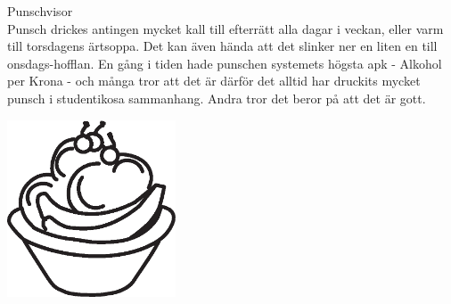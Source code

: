 \begin{flushleft}
{\Huge Punschvisor\\}
\vspace{1cm}
\Large{
Punsch drickes antingen mycket kall till efterrätt alla dagar i veckan,
eller varm till torsdagens ärtsoppa. Det kan även hända att det
slinker ner en liten en till onsdags-hofflan. En gång i tiden hade
punschen systemets högsta apk - Alkohol per Krona - och många tror att
det är därför det alltid har druckits mycket punsch i studentikosa
sammanhang. Andra tror det beror på att det är gott.}
\end{flushleft}

\vspace{2cm}
\begin{center}
\includegraphics[width=5cm]{bilder/punsch.eps}
\end{center}
\newpage

\newpage
{}
\newpage
{}
\newpage
{}
\newpage
{}
\newpage
{}
\newpage
{}
\newpage
{}
\newpage
{}
\newpage
{}
\newpage
{}
\newpage
{}
\newpage
{}
